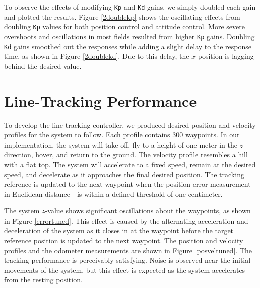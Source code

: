 \documentclass[letter, 10pt]{article}
\begin{document}
\begin{onehalfspacing}
To observe the effects of modifying {\tt Kp} and {\tt Kd} gains,
we simply doubled each gain and plotted the results. Figure \ref{2doublekp} shows the
oscillating effects from doubling {\tt Kp} values for both position control
and attitude control. More severe overshoots and oscillations in most
fields resulted from higher {\tt Kp} gains. Doubling {\tt Kd} gains smoothed out the
responses while adding a slight delay to the response time, as shown in Figure \ref{2doublekd}.
Due to this delay, the $x$-position is lagging behind the desired value.

\section{Line-Tracking Performance}

To develop the line tracking controller, we produced desired position and velocity
profiles for the system to follow. Each profile contains 300 waypoints. In our implementation,
the system will take off, fly to a height of one meter in the $z$-direction, hover,
and return to the ground. The velocity profile resembles a hill with a flat top.
The system will accelerate to a fixed speed, remain at the desired speed, and decelerate
as it approaches the final desired position. The tracking reference is updated to the next
waypoint when the position error measurement - in Euclidean distance - is within a defined
threshold of one centimeter.

The system $z$-value shows significant oscillations about the waypoints,
as shown in Figure \ref{errortuned}. This effect is caused by the alternating acceleration
and deceleration of the system as it closes in at the waypoint before the target
reference position is updated to the next waypoint. The position and velocity profiles
and the odometer measurements are shown in Figure \ref{posveltuned}. The tracking performance is
perceivably satisfying. Noise is observed near the initial movements of the system,
but this effect is expected as the system accelerates from the resting position.


\end{onehalfspacing}
\end{document}
